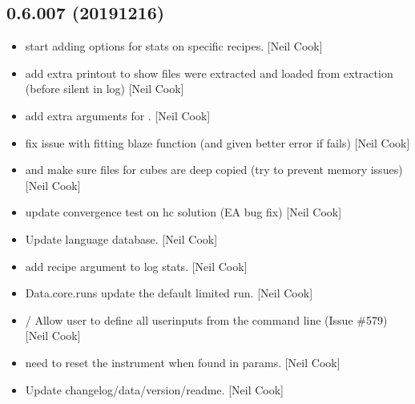 \documentclass[a4paper,10pt,english]{report}
\begin{document}
\subsection{0.6.007 (2019\sphinxhyphen{}12\sphinxhyphen{}16)}
\label{\detokenize{misc/changelog:id31}}\begin{itemize}
\item {} 
 \sphinxhyphen{} start adding options for stats on
specific recipes. {[}Neil Cook{]}

\item {} 
 \sphinxhyphen{} add extra printout to show files were
extracted and loaded from extraction (before silent in log) {[}Neil
Cook{]}

\item {} 
 \sphinxhyphen{} add extra arguments for
. {[}Neil Cook{]}

\item {} 
 \sphinxhyphen{} fix issue with fitting blaze function
(and given better error if  fails) {[}Neil Cook{]}

\item {} 
 and  \sphinxhyphen{} make sure files for
cubes are deep copied (try to prevent memory issues) {[}Neil Cook{]}

\item {} 
 \sphinxhyphen{} update convergence test on hc solution (EA bug
fix) {[}Neil Cook{]}

\item {} 
Update language database. {[}Neil Cook{]}

\item {} 
 \sphinxhyphen{} add recipe argument
to log stats. {[}Neil Cook{]}

\item {} 
Data.core.runs \sphinxhyphen{}  \sphinxhyphen{} update the default limited run.
{[}Neil Cook{]}

\item {} 
 /  \sphinxhyphen{} Allow user to define all userinputs
from the command line (Issue \#579) {[}Neil Cook{]}

\item {} 
 \sphinxhyphen{} need to re\sphinxhyphen{}set the instrument when found in params.
{[}Neil Cook{]}

\item {} 
Update changelog/data/version/readme. {[}Neil Cook{]}

\end{itemize}
\end{document}
